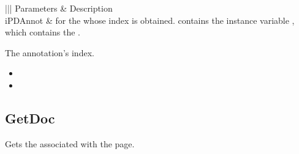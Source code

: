 \documentclass[letterpaper,12pt,english,openany,oneside]{sphinxmanual}
\begin{document}

\begin{sphinxVerbatim}[commandchars=\\\{\}]
  
\end{sphinxVerbatim}
\label{\detokenize{IAC_API_OLE_Objects:parameters-76}}


\begin{savenotes}\sphinxattablestart
\centering
{}\label{\detokenize{IAC_API_OLE_Objects:section-85}}\nobreak
\begin{tabular}[t]{|||}
\hline
\sphinxstyletheadfamily 
Parameters
&\sphinxstyletheadfamily 
Description
\\
\hline
iPDAnnot
&
 for the  whose index is obtained.  contains the instance variable , which contains the .
\\
\hline
\end{tabular}
\par
\sphinxattableend\end{savenotes}


The annotation’s index.

\label{\detokenize{IAC_API_OLE_Objects:related-methods-121}}
\begin{itemize}
\item {} 
 

\item {} 
 

\end{itemize}




\subsection{GetDoc}
\label{\detokenize{IAC_API_OLE_Objects:getdoc-1}}\label{\detokenize{IAC_API_OLE_Objects:id20}}
Gets the  associated with the page.
\end{document}
